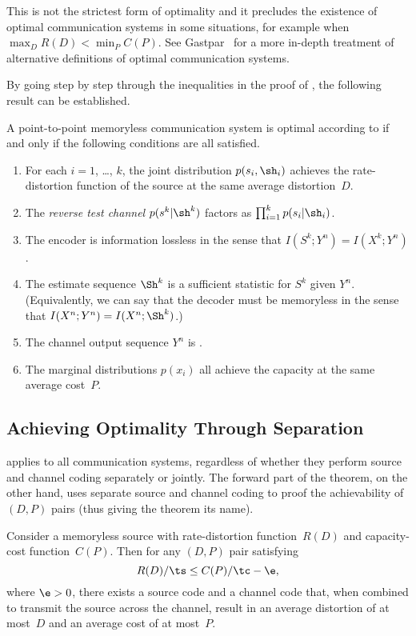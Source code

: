 This is not the strictest form of optimality and it precludes the existence of
optimal communication systems in some situations, for example when $\max_D R(D)
< \min_P C(P)$. See Gastpar~\cite{GastparThesis} for a more in-depth treatment
of alternative definitions of optimal communication systems.

By going step by step through the inequalities in the proof of
, the following result can be established. 

\begin{theorem}
  \label{thm:optimalityconditions}
  A point-to-point memoryless communication system is optimal according to
   if and only if the following conditions are all satisfied.
  \begin{enumerate}
    \item For each $i = 1$, \dots, $k$, the joint distribution $p(s_i,\sh_i)$
      achieves the rate-distortion function of the source at the same average
      distortion~$D$.
    \item The \emph{reverse test channel} $p(s^k|\sh^k)$ factors as
      $\prod_{i=1}^k p(s_i | \sh_i)$. 
    \item The encoder is information lossless in the sense that $I(S^k;Y^n) =
      I(X^k; Y^n)$. 
    \item The estimate sequence $\Sh^k$ is a sufficient statistic for $S^k$
      given $Y^n$. (Equivalently, we can say that the decoder must be memoryless
      in the sense that $I(X^n;Y^n) = I(X^n;\Sh^k)$.)
    \item The channel output sequence $Y^n$ is \iid.
    \item The marginal distributions $p(x_i)$ all achieve the capacity at the
      same average cost~$P$.
  \end{enumerate}
\end{theorem}


\subsection{Achieving Optimality Through Separation}

 applies to all communication systems, regardless of
whether they perform source and channel coding separately or jointly. The
forward part of the theorem, on the other hand, uses separate source and channel
coding to proof the achievability of $(D,P)$ pairs (thus giving the theorem its
name).

\begin{theorem}
  \label{thm:separationforward}
  Consider a memoryless source with rate-distortion function~$R(D)$ and
  capacity-cost function~$C(P)$. Then for any $(D,P)$ pair satisfying
  \begin{equation}
    \label{eq:separationforward}
    R(D)/\ts \le C(P)/\tc - \e,
  \end{equation}
  where $\e > 0$, there exists a source code and a channel code that, when
  combined to transmit the source across the channel, result in an average
  distortion of at most~$D$ and an average cost of at most~$P$.
\end{theorem}

